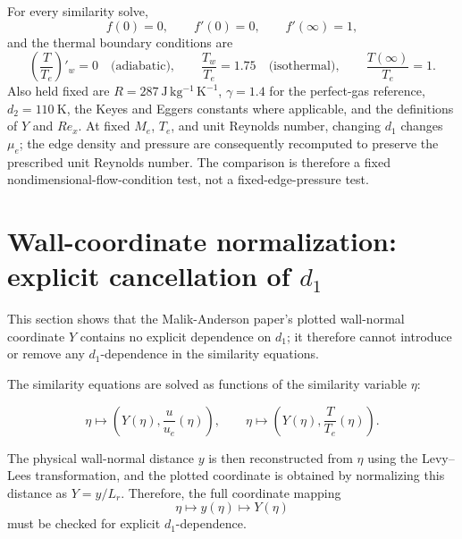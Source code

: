 \documentclass[11pt]{article}
\newcommand{\MA}{Malik-Anderson}
\newcommand{\ue}{u_e}
\newcommand{\Te}{T_e}
\begin{document}
For every similarity solve,
\begin{equation}
  f(0)=0,\qquad f'(0)=0,\qquad f'(\infty)=1,
\end{equation}
and the thermal boundary conditions are
\begin{equation}
  \left(\frac{T}{T_e}\right)'_{\!w}=0
  \quad\text{(adiabatic)},
  \qquad
  \frac{T_w}{T_e}=1.75
  \quad\text{(isothermal)},
  \qquad
  \frac{T(\infty)}{T_e}=1.
\end{equation}
Also held fixed are \(R=287~\mathrm{J\,kg^{-1}\,K^{-1}}\), \(\gamma=1.4\) for the perfect-gas reference, \(d_2=110~\mathrm{K}\), the Keyes and Eggers constants where applicable, and the definitions of \(Y\) and \(Re_x\). At fixed \(M_e\), \(T_e\), and unit Reynolds number, changing \(d_1\) changes \(\mu_e\); the edge density and pressure are consequently recomputed to preserve the prescribed unit Reynolds number. The comparison is therefore a fixed nondimensional-flow-condition test, not a fixed-edge-pressure test.

\section{Wall-coordinate normalization: explicit cancellation of \texorpdfstring{\(d_1\)}{d1}}
\label{sec:wall_coordinate}

This section shows that the \MA{} paper's plotted wall-normal coordinate \(Y\) contains no explicit dependence on \(d_1\); it therefore cannot introduce or remove any \(d_1\)-dependence in the similarity equations.

The similarity equations are solved as functions of the similarity variable \(\eta\):

\[
  \eta\mapsto
  \left(Y(\eta),\frac{u}{\ue}(\eta)\right),
  \qquad
  \eta\mapsto
  \left(Y(\eta),\frac{T}{\Te}(\eta)\right).
\]

The physical wall-normal distance \(y\) is then reconstructed from \(\eta\) using the Levy--Lees transformation, and the plotted coordinate is obtained by normalizing this distance as \(Y=y/L_r\). Therefore, the full coordinate mapping
\[
  \eta \mapsto y(\eta) \mapsto Y(\eta)
\]
must be checked for explicit \(d_1\)-dependence.
\end{document}
